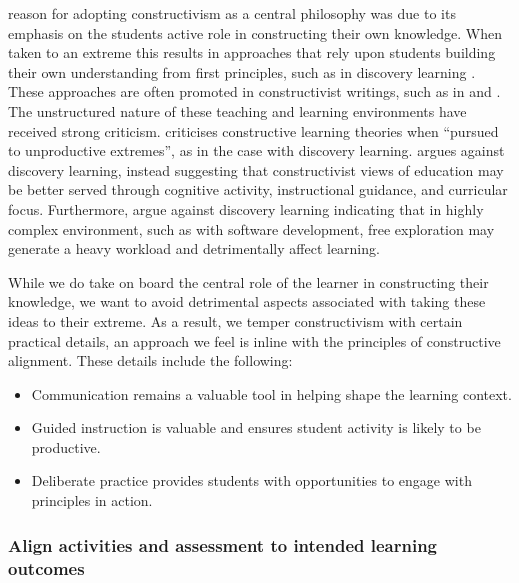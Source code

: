 \citet{Biggs:1996c} reason for adopting constructivism as a central philosophy was due to its emphasis on the students active role in constructing their own knowledge. When taken to an extreme this results in approaches that rely upon students building their own understanding from first principles, such as in discovery learning \cite{Bruner:1961}. These approaches are often promoted in constructivist writings, such as in \citet{Glasersfeld:1989} and \citet{Cunningham:1996}. The unstructured nature of these teaching and learning environments have received strong criticism. \citet{Anderson:1998} criticises constructive learning theories when ``pursued to unproductive extremes'', as in the case with discovery learning. \citet{Mayer:2004} argues against discovery learning, instead suggesting that constructivist views of education may be better served through cognitive activity, instructional guidance, and curricular focus. Furthermore, \citet{Kirschner:2006} argue against discovery learning indicating that in highly complex environment, such as with software development, free exploration may generate a heavy workload and detrimentally affect learning.

While we do take on board the central role of the learner in constructing their knowledge, we want to avoid detrimental aspects associated with taking these ideas to their extreme. As a result, we temper constructivism with certain practical details, an approach we feel is inline with the principles of constructive alignment. These details include the following:

\begin{itemize}
	\item Communication remains a valuable tool in helping shape the learning context.
	\item Guided instruction is valuable and ensures student activity is likely to be productive.
	\item Deliberate practice provides students with opportunities to engage with principles in action.
\end{itemize}


\subsubsection{Align activities and assessment to intended learning outcomes} %
\label{ssub:align_activities_and_assessment_to_intended_learning_outcomes_}

